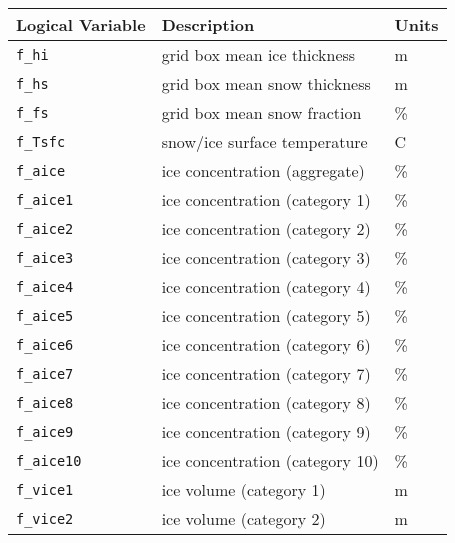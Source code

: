   \begin{center}
   \label{table:history_fields}
   \tablefirsthead{\hline}
   \tablelasttail{\hline}
   \begin{supertabular}{lll} \hline
Logical Variable          & Description                          & Units         \\
\hline \hline
\texttt{f\_hi}      & grid box mean ice thickness          & m             \\
\texttt{f\_hs}      & grid box mean snow thickness         & m             \\
\texttt{f\_fs}      & grid box mean snow fraction          & \%            \\
\texttt{f\_Tsfc}    & snow/ice surface temperature         & C             \\
\texttt{f\_aice}    & ice concentration (aggregate)        & \%            \\
\texttt{f\_aice1}   & ice concentration (category 1)       & \%            \\
\texttt{f\_aice2}   & ice concentration (category 2)       & \%            \\
\texttt{f\_aice3}   & ice concentration (category 3)       & \%            \\
\texttt{f\_aice4}   & ice concentration (category 4)       & \%            \\
\texttt{f\_aice5}   & ice concentration (category 5)       & \%            \\
\texttt{f\_aice6}   & ice concentration (category 6)       & \%            \\
\texttt{f\_aice7}   & ice concentration (category 7)       & \%            \\
\texttt{f\_aice8}   & ice concentration (category 8)       & \%            \\
\texttt{f\_aice9}   & ice concentration (category 9)       & \%            \\
\texttt{f\_aice10}  & ice concentration (category 10)      & \%            \\
\texttt{f\_vice1}   & ice volume (category 1)              & m            \\
\texttt{f\_vice2}   & ice volume (category 2)              & m            \\

\end{supertabular}
\end{center}

